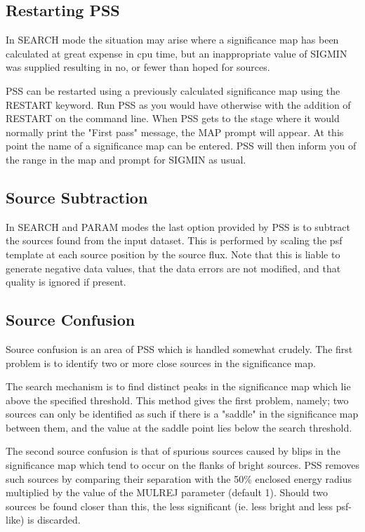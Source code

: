 \documentclass{book}
\renewcommand{\_}{{\tt\char'137}}     %
\begin{document}
\subsection{Restarting PSS}
In SEARCH mode the situation may arise where a significance map has
been calculated at great expense in cpu time, but an inappropriate
value of SIGMIN was supplied resulting in no, or fewer than hoped
for sources.

PSS can be restarted using a previously calculated significance map
using the RESTART keyword. Run PSS as you would have otherwise with
the addition of RESTART on the command line. When PSS gets to the
stage where it would normally print the "First pass" message, the
MAP prompt will appear. At this point the name of a significance map
can be entered. PSS will then inform you of the range in the map and
prompt for SIGMIN as usual.

\subsection{Source Subtraction}
In SEARCH and PARAM modes the last option provided by PSS is to
subtract the sources found from the input dataset. This is performed
by scaling the psf template at each source position by the source
flux.
Note that this is liable to generate negative data values, that the
data errors are not modified, and that quality is ignored if present.
\subsection{Source Confusion}
Source confusion is an area of PSS which is handled somewhat crudely.
The first problem is to identify two or more close sources in the
significance map.

The search mechanism is to find distinct peaks in the significance
map which lie above the specified threshold. This method gives the
first problem, namely;
two sources can only be identified as such if there is a "saddle"
in the significance map between them, and the value at the saddle
point lies below the search threshold.

The second source confusion is that of spurious sources caused by
blips in the significance map which tend to occur on the flanks of
bright sources. PSS removes such sources by comparing their separation
with the 50\% enclosed energy radius multiplied by the value of the
MULREJ parameter (default 1). Should two sources be found closer than
this, the less significant (ie. less bright and less psf-like) is
discarded.
\end{document}
